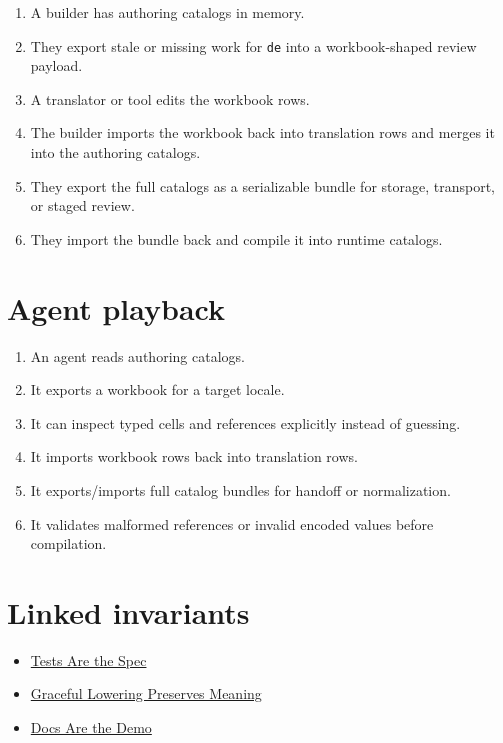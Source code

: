 \begin{enumerate}
\def\labelenumi{\arabic{enumi}.}
\tightlist
\item
  A builder has authoring catalogs in memory.
\item
  They export stale or missing work for \texttt{d\allowbreak{}e} into a workbook-shaped review payload.
\item
  A translator or tool edits the workbook rows.
\item
  The builder imports the workbook back into translation rows and merges it into the authoring catalogs.
\item
  They export the full catalogs as a serializable bundle for storage, transport, or staged review.
\item
  They import the bundle back and compile it into runtime catalogs.
\end{enumerate}

\section{Agent playback}\label{record-190-agent-playback}

\begin{enumerate}
\def\labelenumi{\arabic{enumi}.}
\tightlist
\item
  An agent reads authoring catalogs.
\item
  It exports a workbook for a target locale.
\item
  It can inspect typed cells and references explicitly instead of guessing.
\item
  It imports workbook rows back into translation rows.
\item
  It exports/imports full catalog bundles for handoff or normalization.
\item
  It validates malformed references or invalid encoded values before compilation.
\end{enumerate}

\section{Linked invariants}\label{record-190-linked-invariants}

\begin{itemize}
\tightlist
\item
  \href{https://github.com/flyingrobots/bijou/blob/cbd70612140e7a450d764b3c7be1c6af878b99bc/docs/invariants/tests-are-the-spec.md}{Tests Are the Spec}
\item
  \href{https://github.com/flyingrobots/bijou/blob/cbd70612140e7a450d764b3c7be1c6af878b99bc/docs/invariants/graceful-lowering-preserves-meaning.md}{Graceful Lowering Preserves Meaning}
\item
  \href{https://github.com/flyingrobots/bijou/blob/cbd70612140e7a450d764b3c7be1c6af878b99bc/docs/invariants/docs-are-the-demo.md}{Docs Are the Demo}
\end{itemize}

